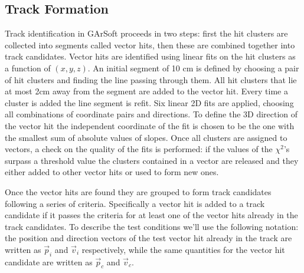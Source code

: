 \subsection{Track Formation}
\label{GArSoft_TrackForming}
Track identification in GArSoft proceeds in two steps: first the hit clusters are collected into segments called vector hits, then these are combined together into track candidates. Vector hits are identified using linear fits on the hit clusters as a function of $(x,y,z)$. An initial segment of 10 cm is defined by choosing a pair of hit clusters and finding the line passing through them. All hit clusters that lie at most 2cm away from the segment are added to the vector hit. Every time a cluster is added the line segment is refit. Six linear 2D fits are applied, choosing all combinations of coordinate pairs and directions. To define the 3D direction of the vector hit the independent coordinate of the fit is chosen to be the one with the smallest sum of absolute values of slopes. Once all clusters are assigned to vectors, a check on the quality of the fits is performed: if the values of the $\chi^2$'s surpass a threshold value the clusters contained in a vector are released and they either added to other vector hits or used to form new ones.

Once the vector hits are found they are grouped to form track candidates following a series of criteria. Specifically a vector hit is added to a track candidate if it passes the criteria for at least one of the vector hits already in the track candidates. To describe the test conditions we'll use the following notation: the position and direction vectors of the test vector hit already in the track are written as $\Vec{p}_i$ and $\Vec{v}_i$ respectively, while the same quantities for the vector hit candidate are written as $\Vec{p}_c$ and $\Vec{v}_c$.

